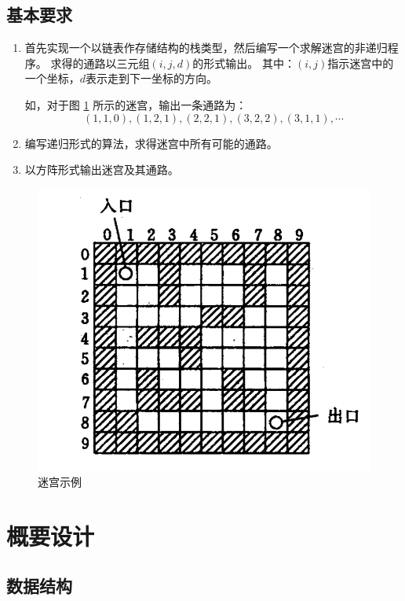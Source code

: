 \documentclass{ctexart}
\begin{document}
    \subsection{基本要求}
    \begin{enumerate}[\indent (1)]
        \item 首先实现一个以链表作存储结构的栈类型，然后编写一个求解迷宫的非递归程序。
        求得的通路以三元组$(i,j,d)$的形式输出。
        其中：$(i,j)$指示迷宫中的一个坐标，$d$表示走到下一坐标的方向。\par
        如，对于图 \ref{img:example} 所示的迷宫，输出一条通路为：
        $$(1,1,0),(1,2,1),(2,2,1),(3,2,2),(3,1,1),\cdots$$
        \item 编写递归形式的算法，求得迷宫中所有可能的通路。
        \item 以方阵形式输出迷宫及其通路。
    \end{enumerate}
    \begin{figure}[b]
        \centering
        \includegraphics[scale=0.5]{迷宫示例.png}
        \caption{迷宫示例}
        \label{img:example}
    \end{figure}
    \section{概要设计}
    \subsection{数据结构}
    
\end{document}
